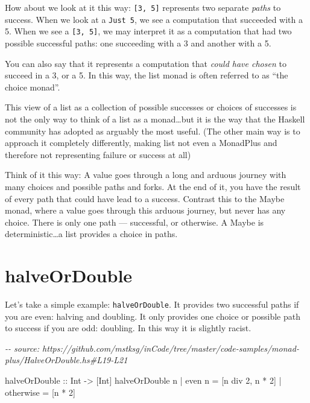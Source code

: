 \documentclass[]{article}
\newenvironment{Shaded}{}{}
\newcommand{\CommentTok}[1]{\textcolor[rgb]{0.38,0.63,0.69}{\textit{#1}}}
\newcommand{\DataTypeTok}[1]{\textcolor[rgb]{0.56,0.13,0.00}{#1}}
\newcommand{\DecValTok}[1]{\textcolor[rgb]{0.25,0.63,0.44}{#1}}
\newcommand{\FunctionTok}[1]{\textcolor[rgb]{0.02,0.16,0.49}{#1}}
\newcommand{\NormalTok}[1]{#1}
\newcommand{\OperatorTok}[1]{\textcolor[rgb]{0.40,0.40,0.40}{#1}}
\newcommand{\OtherTok}[1]{\textcolor[rgb]{0.00,0.44,0.13}{#1}}
\begin{document}
How about we look at it this way: \texttt{{[}3,\ 5{]}} represents two separate
\emph{paths} to success. When we look at a \texttt{Just\ 5}, we see a
computation that succeeded with a 5. When we see a \texttt{{[}3,\ 5{]}}, we may
interpret it as a computation that had two possible successful paths: one
succeeding with a 3 and another with a 5.

You can also say that it represents a computation that \emph{could have chosen}
to succeed in a 3, or a 5. In this way, the list monad is often referred to as
``the choice monad''.

This view of a list as a collection of possible successes or choices of
successes is not the only way to think of a list as a monad\ldots but it is the
way that the Haskell community has adopted as arguably the most useful. (The
other main way is to approach it completely differently, making list not even a
MonadPlus and therefore not representing failure or success at all)

Think of it this way: A value goes through a long and arduous journey with many
choices and possible paths and forks. At the end of it, you have the result of
every path that could have lead to a success. Contrast this to the Maybe monad,
where a value goes through this arduous journey, but never has any choice. There
is only one path --- successful, or otherwise. A Maybe is deterministic\ldots a
list provides a choice in paths.

\hypertarget{halveordouble}{%
\section{halveOrDouble}\label{halveordouble}}

Let's take a simple example: \texttt{halveOrDouble}. It provides two successful
paths if you are even: halving and doubling. It only provides one choice or
possible path to success if you are odd: doubling. In this way it is slightly
racist.

\begin{Shaded}
\begin{Highlighting}[]
\CommentTok{{-}{-} source: https://github.com/mstksg/inCode/tree/master/code{-}samples/monad{-}plus/HalveOrDouble.hs\#L19{-}L21}

\OtherTok{halveOrDouble ::} \DataTypeTok{Int} \OtherTok{{-}>}\NormalTok{ [}\DataTypeTok{Int}\NormalTok{]}
\NormalTok{halveOrDouble n }\OperatorTok{|} \FunctionTok{even}\NormalTok{ n    }\OtherTok{=}\NormalTok{ [n }\OtherTok{\textasciigrave{}div\textasciigrave{}} \DecValTok{2}\NormalTok{, n }\OperatorTok{*} \DecValTok{2}\NormalTok{]}
                \OperatorTok{|} \FunctionTok{otherwise} \OtherTok{=}\NormalTok{ [n }\OperatorTok{*} \DecValTok{2}\NormalTok{]}
\end{Highlighting}
\end{Shaded}
\end{document}
